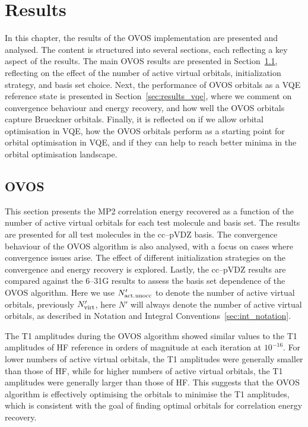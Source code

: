 \chapter{Results}
\label{ch:results}

In this chapter, the results of the OVOS implementation are presented and analysed. The content is structured into several sections, each reflecting a key aspect of the results. The main OVOS results are presented in Section~\ref{sec:results_ovos}, reflecting on the effect of the number of active virtual orbitals, initialization strategy, and basis set choice. Next, the performance of OVOS orbitals as a VQE reference state is presented in Section~\ref{sec:results_vqe}, where we comment on convergence behaviour and energy recovery, and how well the OVOS orbitals capture Brueckner orbitals. Finally, it is reflected on if we allow orbital optimisation in VQE, how the OVOS orbitals perform as a starting point for orbital optimisation in VQE, and if they can help to reach better minima in the orbital optimisation landscape.

\section{OVOS}
\label{sec:results_ovos}

This section presents the MP2 correlation energy recovered as a function of the number of active virtual orbitals for each test molecule and basis set. The results are presented for all test molecules in the cc--pVDZ basis. The convergence behaviour of the OVOS algorithm is also analysed, with a focus on cases where convergence issues arise. The effect of different initialization strategies on the convergence and energy recovery is explored. Lastly, the cc--pVDZ results are compared against the 6--31G results to assess the basis set dependence of the OVOS algorithm. Here we use $N'_{\rm act.unocc}$ to denote the number of active virtual orbitals, previously $N'_{\rm virt}$, here $N'$ will always denote the number of active virtual orbitals, as described in Notation and Integral Conventions~\ref{sec:int_notation}.

The T1 amplitudes during the OVOS algorithm showed similar values to the T1 amplitudes of HF reference in orders of magnitude at each iteration at $10^{-16}$. For lower numbers of active virtual orbitals, the T1 amplitudes were generally smaller than those of HF, while for higher numbers of active virtual orbitals, the T1 amplitudes were generally larger than those of HF. This suggests that the OVOS algorithm is effectively optimising the orbitals to minimise the T1 amplitudes, which is consistent with the goal of finding optimal orbitals for correlation energy recovery.

